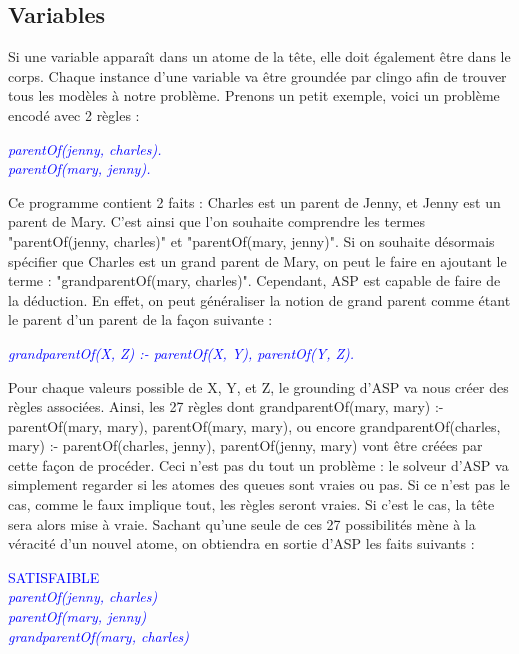 \documentclass[12pt,a4paper]{article}
\begin{document}
\subsection{Variables}
Si une variable apparaît dans un atome de la tête, elle doit également être dans le corps. Chaque instance d'une variable va être groundée par clingo afin de trouver tous les modèles à notre problème.
Prenons un petit exemple, voici un problème encodé avec 2 règles :
\begin{center}
\emph{
	\textcolor{blue}{
  parentOf(jenny, charles).\\
  parentOf(mary, jenny).
	}
}
\end{center}
Ce programme contient 2 faits : Charles est un parent de Jenny, et Jenny est un parent de Mary. C'est ainsi que l'on souhaite comprendre les termes "parentOf(jenny, charles)" et "parentOf(mary, jenny)".
Si on souhaite désormais spécifier que Charles est un grand parent de Mary, on peut le faire en ajoutant le terme : "grandparentOf(mary, charles)". Cependant, ASP est capable de faire de la déduction.
En effet, on peut généraliser la notion de grand parent comme étant le parent d'un parent de la façon suivante :
\begin{center}
\emph{
	\textcolor{blue}{
  grandparentOf(X, Z) :- parentOf(X, Y), parentOf(Y, Z).
	}
}
\end{center}
Pour chaque valeurs possible de X, Y, et Z, le grounding d'ASP va nous créer des règles associées.
Ainsi, les 27 règles dont grandparentOf(mary, mary) :- parentOf(mary, mary), parentOf(mary, mary), ou encore grandparentOf(charles, mary) :- parentOf(charles, jenny), parentOf(jenny, mary) vont être créées 
par cette façon de procéder. Ceci n'est pas du tout un problème : le solveur d'ASP va simplement regarder si les atomes des queues sont vraies ou pas. Si ce n'est pas le cas, comme le faux implique tout, 
les règles seront vraies. Si c'est le cas, la tête sera alors mise à vraie. Sachant qu'une seule de ces 27 possibilités mène à la véracité d'un nouvel atome, on obtiendra en sortie d'ASP les faits suivants :
\begin{center}
\textcolor{blue}{
  SATISFAIBLE\\
	\emph{
  parentOf(jenny, charles)\\
  parentOf(mary, jenny)\\
  grandparentOf(mary, charles)
	}
}
\end{center}
\end{document}
